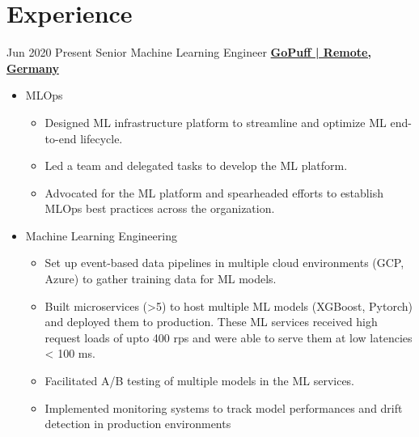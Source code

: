 \documentclass[letterpaper]{DS_class_file} %
\begin{document}
\makeprofile %




\section{Experience}

\begin{twenty}
    \twentyitem
		{Jun 2020}
		{Present}
		{\hspace{0.3cm}Senior Machine Learning Engineer}
		{\href{https://www.gopuff.com/}{\textbf{GoPuff | Remote, Germany}}}
		{}
		{\begin{itemize}
        \item MLOps
            \begin{itemize}
            \item Designed ML  infrastructure platform to streamline and optimize ML end-to-end lifecycle.
            \item Led a team and delegated tasks to develop the ML platform.
            \item Advocated for the ML platform and spearheaded efforts to establish MLOps best practices across the organization.
            \end{itemize}
        \item Machine Learning Engineering
            \begin{itemize}
            \item Set up event-based data pipelines in multiple cloud environments (GCP, Azure) to gather training data for ML models.
            \item Built microservices (>5) to host multiple ML models (XGBoost, Pytorch) and deployed them to production. These ML services received high request loads of upto 400 rps and were able to serve them at low latencies < 100 ms.
            \item Facilitated A/B testing of multiple models in the ML services.
            \item Implemented monitoring systems to track model performances and drift detection in production environments

\end{itemize}
\end{itemize}}
\end{twenty}
\end{document}
